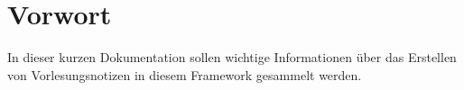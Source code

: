 \chapter*{Vorwort}
In dieser kurzen Dokumentation sollen wichtige Informationen über das Erstellen von Vorlesungsnotizen in diesem Framework gesammelt werden.
